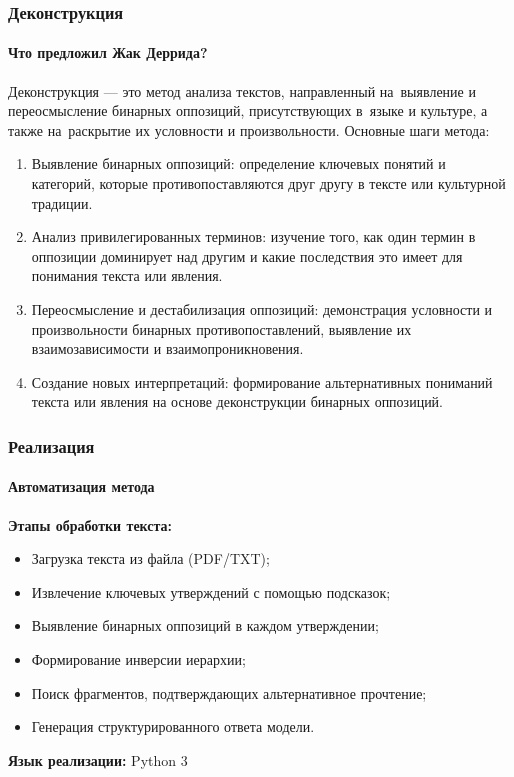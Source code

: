 \documentclass{beamer}
\begin{document}
\begin{frame}
\frametitle{Деконструкция}
\framesubtitle{Что предложил Жак Деррида?}

{\small

Деконструкция — это метод анализа текстов, направленный на~выявление и переосмысление бинарных оппозиций, присутствующих в~языке и культуре, а также на~раскрытие их условности и произвольности.
Основные шаги метода:

\begin{enumerate}
\item{Выявление бинарных оппозиций: определение ключевых понятий и категорий, которые противопоставляются друг другу в тексте или культурной традиции.}
\item{Анализ привилегированных терминов: изучение того, как один термин в оппозиции доминирует над другим и какие последствия это имеет для понимания текста или явления.}
\item{Переосмысление и дестабилизация оппозиций: демонстрация условности и произвольности бинарных противопоставлений, выявление их взаимозависимости и взаимопроникновения.}
\item{Создание новых интерпретаций: формирование альтернативных пониманий текста или явления на основе деконструкции бинарных оппозиций.}
\end{enumerate}

}
\end{frame}

\begin{frame}
\frametitle{Реализация}
\framesubtitle{Автоматизация метода}

\textbf{Этапы обработки текста:}

\vspace{0.3cm}

\begin{itemize}
\item Загрузка текста из файла (PDF/TXT);
\item Извлечение ключевых утверждений с помощью подсказок;
\item Выявление бинарных оппозиций в каждом утверждении;
\item Формирование инверсии иерархии;
\item Поиск фрагментов, подтверждающих альтернативное прочтение;
\item Генерация структурированного ответа модели.
\end{itemize}

\vspace{0.5cm}

\textbf{Язык реализации:} Python 3
\end{frame}
\end{document}
